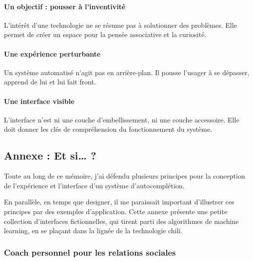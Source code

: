 \documentclass[]{article}
\let\oldparagraph\paragraph
\renewcommand{\paragraph}[1]{\oldparagraph{#1}\mbox{}}
\begin{document}
\hypertarget{un-objectif-pousser-uxe0-linventivituxe9}{%
\paragraph{Un objectif : pousser à
l'inventivité}\label{un-objectif-pousser-uxe0-linventivituxe9}}

L'intérêt d'une technologie ne se résume pas à solutionner des
problèmes. Elle permet de créer un espace pour la pensée associative et
la curiosité.

\hypertarget{une-expuxe9rience-perturbante}{%
\paragraph{Une expérience
perturbante}\label{une-expuxe9rience-perturbante}}

Un système automatisé n'agit pas en arrière-plan. Il pousse l'usager à
se dépasser, apprend de lui et lui fait front.

\hypertarget{une-interface-visible}{%
\paragraph{Une interface visible}\label{une-interface-visible}}

L'interface n'est ni une couche d'embellissement, ni une couche
accessoire. Elle doit donner les clés de compréhension du fonctionnement
du système.

\newpage

\hypertarget{annexe-et-si}{%
\subsection{Annexe : Et si\ldots{} ?}\label{annexe-et-si}}

Toute au long de ce mémoire, j'ai défendu plusieurs principes pour la
conception de l'expérience et l'interface d'un système d'autocomplétion.

En parallèle, en temps que designer, il me paraissait important
d'illustrer ces principes par des exemples d'application. Cette annexe
présente une petite collection d'interfaces fictionnelles, qui tirent
parti des algorithmes de machine learning, en se plaçant dans la lignée
de la technologie chili.

\newpage

\hypertarget{coach-personnel-pour-les-relations-sociales}{%
\subsubsection{Coach personnel pour les relations
sociales}\label{coach-personnel-pour-les-relations-sociales}}
\end{document}
